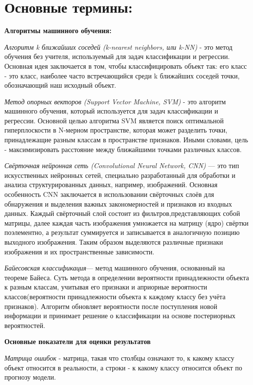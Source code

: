\documentclass[14pt, a4paper]{extarticle}
\begin{document}
\section{Основные термины:}
\textbf{Алгоритмы машинного обучения:}

\textit{Алгоритм k ближайших соседей (k-nearest neighbors, или k-NN)} - это метод обучения без учителя, используемый для задач классификации и регрессии. Основная идея заключается в том, чтобы классифицировать объект так: его класс - это класс, наиболее часто встречающийся среди k ближайших соседей точки, обозначающий наш исходный объект.

\textit{Метод опорных векторов (Support Vector Machine, SVM)} - это алгоритм машинного обучения, который используется для задач классификации и регрессии. Основной целью алгоритма SVM является поиск оптимальной гиперплоскости в N-мерном пространстве, которая может разделить точки, принадлежащие разным классам в пространстве признаков. Иными словами, цель -  максимизировать расстояние между ближайшими точками различных классов.

\textit{Свёрточная нейронная сеть (Convolutional Neural Network, CNN)} — это тип искусственных нейронных сетей, специально разработанный для обработки и анализа структурированных данных, например, изображений. Основная особенность CNN заключается в использовании свёрточных слоёв для обнаружения и выделения важных закономерностей и признаков из входных данных. Каждый свёрточный слой состоит из фильтров,представляющих собой матрицы, далее каждая часть изображения умножается на матрицу (ядро) свёртки поэлементно, а результат суммируется и записывается в аналогичную позицию выходного изображения. Таким образом выделяются различные признаки изображения и их пространственные зависимости.

\textit{Байесовская классификация}— метод машинного обучения, основанный на теореме Байеса. Суть метода в определении вероятности принадлежности объекта к разным классам, учитывая его признаки и априорные вероятности классов(вероятности принадлежности объекта к каждому классу без учёта признаков). Алгоритм обновляет вероятности после поступления новой информации и принимает решение о классификации на основе постериорных вероятностей. 

\textbf{Основные показатели для оценки результатов}

\textit{Матрица ошибок} - матрица, такая что столбцы означают то, к какому классу объект относится в реальности, а строки - к какому классу относится объект по прогнозу модели.
\end{document}
